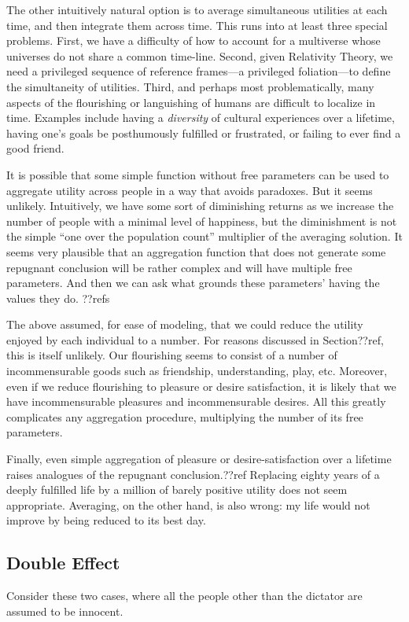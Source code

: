 The other intuitively natural option is to average simultaneous utilities at each time, and then integrate them across time. This runs into
at least three special problems. First, we have a difficulty of how to account for a multiverse whose universes do not share a 
common time-line. Second, given Relativity Theory, we need a privileged sequence of reference frames---a privileged foliation---to define the 
simultaneity of utilities. Third, and perhaps most problematically, many aspects of the flourishing or languishing of 
humans are difficult to localize in time. Examples include having a \textit{diversity} of cultural experiences over a lifetime, having 
one's goals be posthumously fulfilled or frustrated, or failing to ever find a good friend.


It is possible that some simple function without free parameters can be used to aggregate utility across people in a way that
avoids paradoxes. But it seems unlikely. Intuitively, we have some sort of diminishing returns as we increase the number of
people with a minimal level of happiness, but the diminishment is not the simple ``one over the population count'' multiplier of
the averaging solution. It seems very plausible that an aggregation function that does not generate some repugnant conclusion will
be rather complex and will have multiple free parameters. And then we can ask what grounds these parameters' having the values they
do. ??refs


The above assumed, for ease of modeling, that we could reduce the utility enjoyed by each individual to a number. For reasons 
discussed in Section??ref, this is itself unlikely. Our flourishing seems to consist of a number of incommensurable goods such 
as friendship, understanding, play, etc. Moreover, even if we reduce flourishing to pleasure or desire satisfaction, it is 
likely that we have incommensurable pleasures and incommensurable desires. All this greatly complicates any aggregation procedure,
multiplying the number of its free parameters. 

Finally, even simple aggregation of pleasure or desire-satisfaction over a lifetime raises analogues of the 
repugnant conclusion.??ref Replacing eighty years of a deeply fulfilled life by a million of barely positive
utility does not seem appropriate. Averaging, on the other hand, is also wrong: my life would not improve by
being reduced to its best day. 

\subsection{Double Effect}
Consider these two cases, where all the people other than the dictator are assumed to be innocent.

